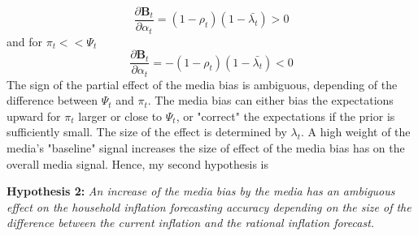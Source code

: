 \documentclass[review]{elsarticle}
\begin{document}
\begin{equation}
\frac{\partial \mathbf{B}_t}{\partial \alpha_t} = (1-\rho_t) (1-\bar{\lambda_t}) > 0 
\end{equation}
and for $\pi_t << \Psi_t$
\begin{equation}
\frac{\partial \mathbf{B}_t}{\partial \alpha_t} = -(1-\rho_t) (1-\bar{\lambda_t}) < 0 
\end{equation}
The sign of the partial effect of the media bias is ambiguous, depending of the difference between $\Psi_t$ and $\pi_t$. The media bias can either bias the expectations upward for $\pi_t$ larger or close to $\Psi_t$, or "correct" the expectations if the prior is sufficiently small. The size of the effect is determined by $\lambda_t$.  A high weight of the media's "baseline" signal increases the size of effect of the media bias has on the overall media signal. 
Hence, my second hypothesis is
\par
\textbf{Hypothesis 2:} \textit{An increase of the media bias by the media has an ambiguous effect on the household inflation forecasting accuracy depending on the size of the difference between the current inflation and the rational inflation forecast.}
\end{document}
